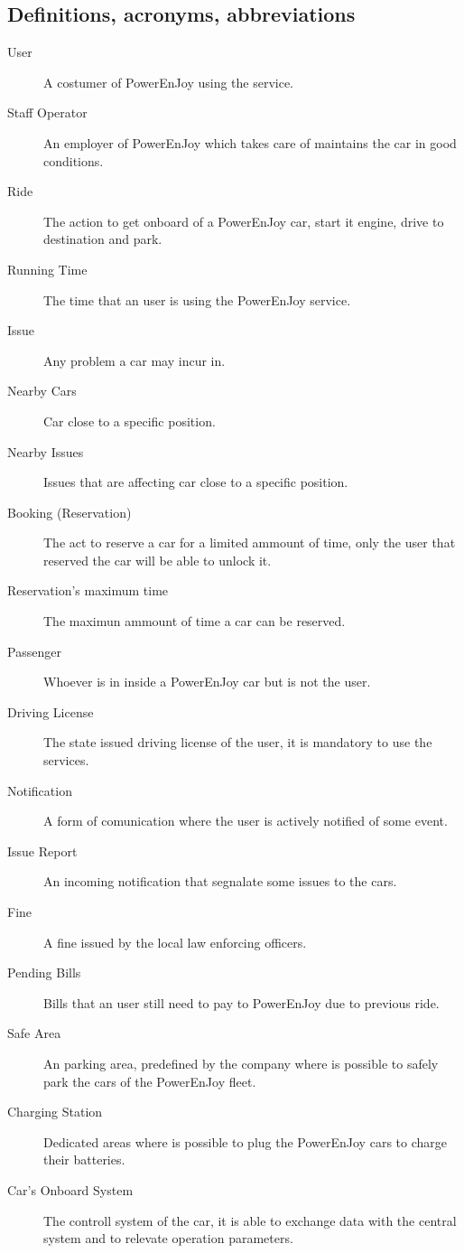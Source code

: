 \documentclass[11pt]{article} %
\newcommand{\pe}{PowerEnJoy }
\begin{document}
\subsection{Definitions, acronyms, abbreviations}
  \begin{description}
	\item[User] A costumer of \pe using the service.
	\item[Staff Operator] An employer of \pe which takes care of maintains the car in good conditions.
	\item[Ride] The action to get onboard of a \pe car, start it engine, drive to destination and park.
  	\item[Running Time] The time that an user is using the \pe service.
	\item[Issue] Any problem a car may incur in.
	\item[Nearby Cars] Car close to a specific position.
	\item[Nearby Issues] Issues that are affecting car close to a specific position.
	\item[Booking (Reservation)] The act to reserve a car for a limited ammount of time, only the user that reserved the car will be able to unlock it.
	\item[Reservation's maximum time] The maximun ammount of time a car can be reserved.
	\item[Passenger] Whoever is in inside a \pe car but is not the user.
	\item[Driving License] The state issued driving license of the user, it is mandatory to use the services.
	\item[Notification] A form of comunication where the user is actively notified of some event.
	\item[Issue Report] An incoming notification that segnalate some issues to the cars.
	\item[Fine] A fine issued by the local law enforcing officers. 
	\item[Pending Bills] Bills that an user still need to pay to \pe due to previous ride.
	\item[Safe Area] An parking area, predefined by the company where is possible to safely park the cars of the \pe fleet.
	\item[Charging Station] Dedicated areas where is possible to plug the \pe cars to charge their batteries.
	\item[Car's Onboard System] The controll system of the car, it is able to exchange data with the central system and to relevate operation parameters.

\end{description}
\end{document}
